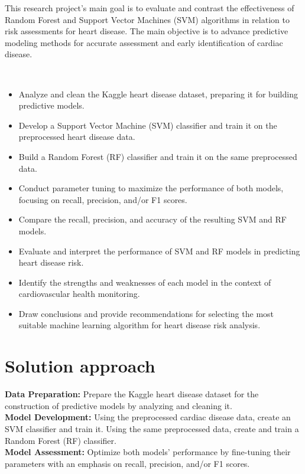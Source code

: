 This research project's main goal is to evaluate and contrast the effectiveness of Random Forest and Support Vector Machines (SVM) algorithms in relation to risk assessments for heart disease. The main objective is to advance predictive modeling methods for accurate assessment and early identification of cardiac disease.

\


\begin{itemize}
  \item Analyze and clean the Kaggle heart disease dataset, preparing it for building predictive models.
  \item Develop a Support Vector Machine (SVM) classifier and train it on the preprocessed heart disease data.
  \item Build a Random Forest (RF) classifier and train it on the same preprocessed data.
  \item Conduct parameter tuning to maximize the performance of both models, focusing on recall, precision, and/or F1 scores.
  \item Compare the recall, precision, and  accuracy of the resulting SVM and RF models.
  \item Evaluate and interpret the performance of SVM and RF models in predicting heart disease risk.
  \item Identify the strengths and weaknesses of each model in the context of cardiovascular health monitoring.
  \item Draw conclusions and provide recommendations for selecting the most suitable machine learning algorithm for heart disease risk analysis.
\end{itemize}



\section{Solution approach}
\label{sec:intro_sol} %
\textbf{Data Preparation:} Prepare the Kaggle heart disease dataset for the construction of predictive models by analyzing and cleaning it.
\\
\textbf{Model Development:} Using the preprocessed cardiac disease data, create an SVM classifier and train it. Using the same preprocessed data, create and train a Random Forest (RF) classifier.
\\
\textbf{Model Assessment:} Optimize both models' performance by fine-tuning their parameters with an emphasis on recall, precision, and/or F1 scores.

